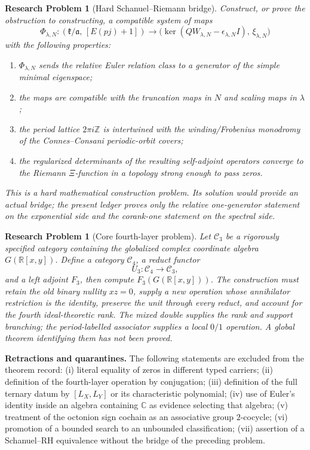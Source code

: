 \documentclass[11pt]{article}
\newtheorem{problem}[definition]{Research Problem}
\newcommand{\Z}{\mathbb Z}
\newcommand{\R}{\mathbb R}
\newcommand{\C}{\mathbb C}
\begin{document}
\begin{problem}[Hard Schanuel--Riemann bridge]
Construct, or prove the obstruction to constructing, a compatible system of maps
\[
\Phi_{\lambda,N}:
(\mathfrak k/\mathfrak a,\,[E(pj)+1])
\longrightarrow
\bigl(\ker(QW_{\lambda,N}-\epsilon_{\lambda,N}I),\,\xi_{\lambda,N}\bigr)
\]
with the following properties:
\begin{enumerate}[label=(\roman*)]
\item $\Phi_{\lambda,N}$ sends the relative Euler relation class to a generator of the simple minimal eigenspace;
\item the maps are compatible with the truncation maps in $N$ and scaling maps in $\lambda$;
\item the period lattice $2\pi i\Z$ is intertwined with the winding/Frobenius monodromy of the Connes--Consani periodic-orbit covers;
\item the regularized determinants of the resulting self-adjoint operators converge to the Riemann $\Xi$-function in a topology strong enough to pass zeros.
\end{enumerate}
This is a hard mathematical construction problem.  Its solution would provide an actual bridge; the present ledger proves only the relative one-generator statement on the exponential side and the corank-one statement on the spectral side.
\end{problem}

\begin{problem}[Core fourth-layer problem]
Let $\mathcal C_3$ be a rigorously specified category containing the globalized complex coordinate algebra $G(\R[x,y])$.  Define a category $\mathcal C_4$, a reduct functor
\[
U_3:\mathcal C_4\to\mathcal C_3,
\]
and a left adjoint $F_3$, then compute $F_3(G(\R[x,y]))$.  The construction must retain the old binary nullity $xz=0$, supply a new operation whose annihilator restriction is the identity, preserve the unit through every reduct, and account for the fourth ideal-theoretic rank.  The mixed double supplies the rank and support branching; the period-labelled associator supplies a local $0/1$ operation.  A global theorem identifying them has not been proved.
\end{problem}

\noindent\textbf{Retractions and quarantines.}
The following statements are excluded from the theorem record: (i) literal equality of zeros in different typed carriers; (ii) definition of the fourth-layer operation by conjugation; (iii) definition of the full ternary datum by $[L_X,L_Y]$ or its characteristic polynomial; (iv) use of Euler's identity inside an algebra containing $\C$ as evidence selecting that algebra; (v) treatment of the octonion sign cochain as an associative group $2$-cocycle; (vi) promotion of a bounded search to an unbounded classification; (vii) assertion of a Schanuel--RH equivalence without the bridge of the preceding problem.
\end{document}
